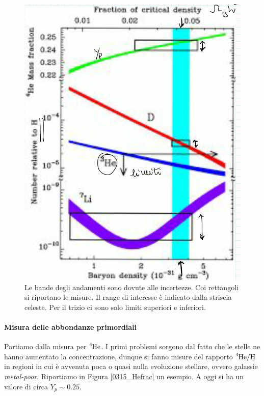 \begin{figure}[!h]
    \centering
    \includegraphics[scale=0.2]{Immagini/0315_massfraction2.png}
    \caption{Le bande degli andamenti sono dovute alle incertezze. Coi rettangoli si riportano le misure. Il range di interesse è indicato dalla striscia celeste. Per il trizio ci sono solo limiti superiori e inferiori.}
    \label{0315_mfrac2}
\end{figure}
\newpage
\paragraph{Misura delle abbondanze primordiali} Partiamo dalla misura per $\ce{^4He}$. I primi problemi sorgono dal fatto che le stelle ne hanno aumentato la concentrazione, dunque si fanno misure del rapporto $\ce{^4He}/\ce{H}$ in regioni in cui è avvenuta poca o quasi nulla evoluzione stellare, ovvero galassie \textit{metal-poor}. Riportiamo in Figura \ref{0315_Hefrac} un esempio. A oggi si ha un valore di circa $Y_p \sim 0.25$.

